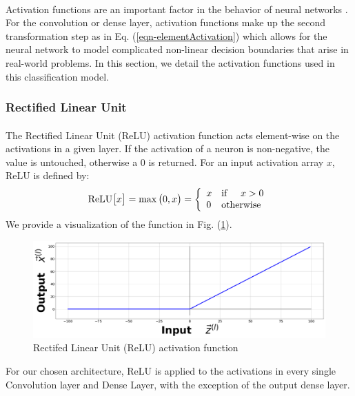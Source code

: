 \documentclass[12pt,letterpaper]{article}
\begin{document}
\paragraph*{}Activation functions are an important factor in the behavior of neural networks \cite{Geron}. For the convolution or dense layer, activation functions make up the second transformation step as in Eq. (\ref{eqn-elementActivation}) which allows for the neural network to model complicated non-linear decision boundaries that arise in real-world problems. In this section, we detail the activation functions used in this classification model.

\subsubsection{Rectified Linear Unit}

\paragraph*{}The Rectified Linear Unit (ReLU) activation function acts element-wise on the activations in a given layer. If the activation of a neuron is non-negative, the value is untouched, otherwise a $0$ is returned. For an input activation array $x$, ReLU is defined by:
\begin{equation}
\label{eqn-ReLU}
\text{ReLU}\big[x\big] = \max\big(0,x\big) = \left\{
\begin{array}{ll}
    x & \text{if\hspace{0.5cm}} x > 0 \\
    0 & \text{otherwise}
\end{array} 
\right.
\end{equation}
We provide a visualization of the function in Fig. (\ref{fig-ReLU}).
\begin{figure}[H]
\begin{center}
\includegraphics[scale=0.25]{../Figures/RectifiedLinearUnit}
\end{center}
\caption{Rectifed Linear Unit (ReLU) activation function}
\label{fig-ReLU}
\end{figure}
For our chosen architecture, ReLU is applied to the activations in every single Convolution layer and Dense Layer, with the exception of the output dense layer.
\end{document}
